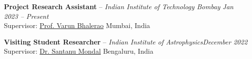 \textbf{Project Research Assistant} -- \textit{Indian Institute of Technology Bombay}
\hfill \textit{Jan 2023 -- Present} \\
Supervisor: \href{https://www.phy.iitb.ac.in/en/content/prof-varun-bhalerao}{Prof. Varun Bhalerao} \hfill  Mumbai, India


\vspace{0.5em}

\textbf{Visiting Student Researcher} -- \textit{Indian Institute of Astrophysics}\hfill \textit{December 2022} \\
Supervisor: \href{https://santanumondal.wixsite.com/horizon}{Dr. Santanu Mondal} \hfill Bengaluru, India
